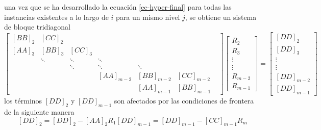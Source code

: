 \documentclass[letterpaper, openright, 12pt]{book}
\begin{document}
        una vez que se ha desarrollado la ecuación \ref{ec-hyper-final} para
        todas las instancias existentes a lo largo de $i$ para un mismo nivel
        $j$, se obtiene un sistema de bloque tridiagonal
        \begin{equation}
            \begin{bmatrix}
            \left[ BB \right]_2 & \left[ CC \right]_2 & & & & \\
            \left[AA\right]_3 & \left[BB\right]_3 & \left[CC\right]_3 & & & \\
            & \ddots & \ddots &  \ddots & & \\
            & & \ddots & \ddots & \ddots & & \\
            & & & \left[AA\right]_{m-2} & \left[BB\right]_{m-2} & \left[CC\right]_{m-2}\\
            & & & & \left[AA\right]_{m-1} & \left[BB\right]_{m-1}
            \end{bmatrix}
            \begin{bmatrix}
            R_{2}\\
            R_{3}\\
            \vdots\\
            \vdots\\
            R_{m-2}\\
            R_{m-1}
            \end{bmatrix}
            = \begin{bmatrix}
            \left[DD\right]_2\\
            \left[DD\right]_3\\
            \vdots\\
            \vdots\\
            \left[DD\right]_{m-2}\\
            \left[DD\right]_{m-1}
            \end{bmatrix}
        \end{equation}
        los términos $\left[DD\right]_2$ y $\left[DD\right]_{m - 1}$ son
        afectados por las condiciones de frontera de la siguiente manera
        \begin{subequations}
            \begin{equation*}
                \left[DD\right]_2 = \left[DD\right]_2 - \left[AA\right]_2 R_1
            \end{equation*}
            \begin{equation*}
                \left[DD\right]_{m - 1} = \left[DD\right]_{m - 1} - \left[CC\right]_{m - 1} R_{m}
            \end{equation*}
        \end{subequations}
\end{document}
